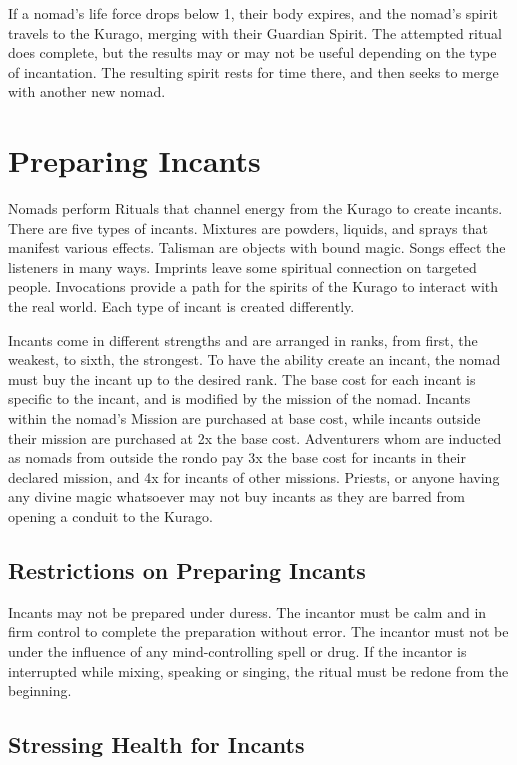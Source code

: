 If a nomad’s life force drops below 1, their body expires, and the nomad’s spirit travels to the Kurago, merging with their Guardian Spirit. The attempted ritual does complete, but the results may or may not be useful depending on the type of incantation. The resulting spirit rests for time there, and then seeks to merge with another new nomad.

\section{Preparing Incants}

Nomads perform Rituals that channel energy from the Kurago to create incants. There are five types of incants. Mixtures are powders, liquids, and sprays that manifest various effects. Talisman are objects with bound magic. Songs effect the listeners in many ways. Imprints leave some spiritual connection on targeted people. Invocations provide a path for the spirits of the Kurago to interact with the real world. Each type of incant is created differently.

Incants come in different strengths and are arranged in ranks, from first, the weakest, to sixth, the strongest. To have the ability create an incant, the nomad must buy the incant up to the desired rank. The base cost for each incant is specific to the incant, and is modified by the mission of the nomad. Incants within the nomad's Mission are purchased at base cost, while incants outside their mission are purchased at 2x the base cost.
Adventurers whom are inducted as nomads from outside the rondo pay 3x the base cost for incants in their declared mission, and 4x for incants
of other missions. Priests, or anyone having any divine magic whatsoever may not buy incants as they are barred from opening a conduit to the Kurago.

\subsection{Restrictions on Preparing Incants}

Incants may not be prepared under duress. The incantor must be calm and in firm control to complete the preparation without error. The incantor must not be under the influence of any mind-controlling spell or drug. If the incantor is interrupted while mixing, speaking or singing, the ritual must be redone from the beginning.

\subsection{Stressing Health for Incants}


